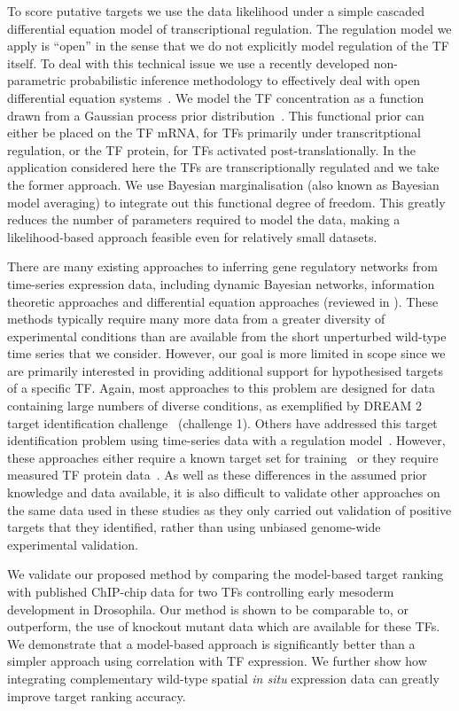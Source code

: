 \documentclass{pnastwo}
\begin{document}
\begin{article}
To score putative targets we use the data likelihood under a simple
cascaded differential equation model of transcriptional regulation. The regulation model
we apply is ``open'' in the sense that we do not explicitly model regulation of the TF
itself. To deal with this technical issue we use a recently developed
non-parametric probabilistic inference methodology to
effectively deal with open differential equation
systems~\cite{Gao2008}. We model the TF concentration as a function
drawn from a Gaussian process prior distribution~\cite{Rasmussen2006}. This functional prior can either be placed
on the TF mRNA, for TFs primarily under transcritptional regulation,
or the TF protein, for TFs activated post-translationally. In the
application considered here the TFs are transcriptionally regulated
and we take the former approach. We use Bayesian marginalisation (also
known as Bayesian model averaging) to
integrate out this functional degree of freedom. This greatly reduces the
number of parameters required to model the data, making a
likelihood-based approach feasible even for relatively small
datasets. 

There are many existing approaches to inferring gene regulatory networks from
time-series expression data, including dynamic Bayesian networks,
information theoretic approaches and differential equation approaches
(reviewed in \cite{Bansal2007a}). These methods typically require many
more data from a greater diversity of experimental conditions than are
available from the short unperturbed wild-type time series that we
consider. However, our goal is more limited in scope since
we are primarily interested in providing additional support for hypothesised
targets of a specific TF. Again, most approaches to this problem are
designed for data containing large numbers of diverse conditions, as
exemplified by DREAM 2 target identification
challenge~\cite{Stolovitzky2007} (challenge 1). Others
have addressed this target identification problem using time-series
data with a regulation model~\cite{Barenco2006a,Gatta2008}. However,
these approaches either require a known target set for training~\cite{Barenco2006a} or
they require measured TF protein data~\cite{Gatta2008}. As well as
these differences in the assumed prior knowledge and data available,
it is also difficult to validate other approaches on the same data used in these
studies as they only carried out validation of positive targets
that they identified, rather than using unbiased genome-wide
experimental validation. 

We validate our proposed method by comparing the model-based target
ranking with published ChIP-chip data for two TFs controlling early
mesoderm development in Drosophila. Our method is shown to be comparable
to, or outperform, the use of knockout mutant data which are available
for these TFs. We demonstrate that a model-based approach is significantly
better than a simpler approach using correlation with TF
expression. We further show how integrating complementary wild-type spatial
{\em in situ} expression data can greatly improve target ranking accuracy. 


\end{article}
\end{document}
